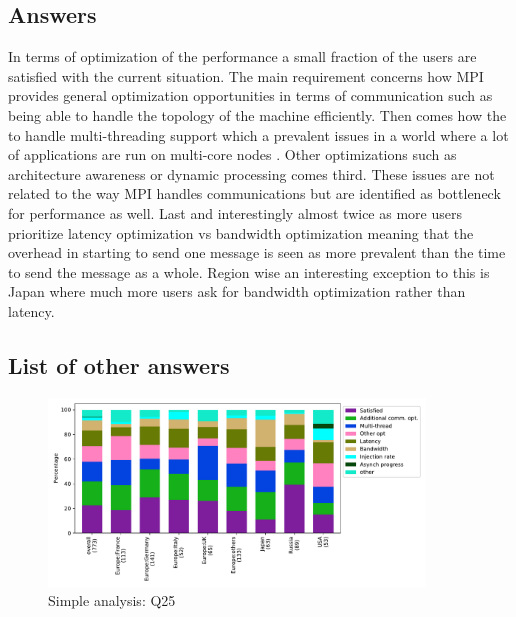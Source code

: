 
\subsection{Answers}


In terms of optimization of the performance a small fraction of the users
are satisfied with the current situation. The main requirement concerns how MPI
provides general optimization opportunities in terms of communication such as
being able to handle the topology of the machine efficiently. Then comes how the
to handle multi-threading support which a prevalent issues in a world where a
lot of applications are run on multi-core nodes . Other optimizations such as architecture awareness or dynamic
processing comes third. These issues are not related to the way MPI handles
communications but are identified as bottleneck for performance as well. Last
and interestingly almost twice as more users prioritize latency
optimization vs bandwidth optimization meaning that the overhead in starting to
send one message is seen as more prevalent than the time to send the message as
a whole. Region wise an interesting exception to this is Japan where much more
users ask for bandwidth optimization rather than
latency. 

\subsection{List of other answers}
\begin{itemize}

\end{itemize}

\begin{figure}[htb]
\begin{center}
\includegraphics[width=10cm]{../pdfs/Q25.pdf}
\caption{Simple analysis: Q25}
\label{fig:Q25}
\end{center}
\end{figure}

